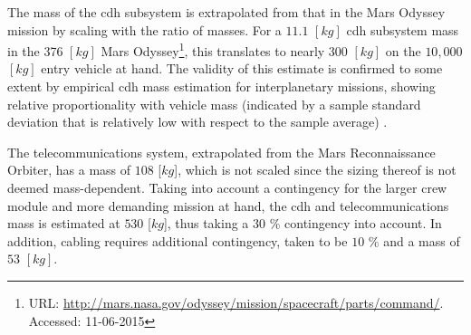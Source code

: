 The mass of the \gls{cdh} subsystem is extrapolated from that in the Mars Odyssey mission by scaling with the ratio of masses. For a $11.1$ $[kg]$ \gls{cdh} subsystem mass in the 376 $[kg]$ Mars Odyssey\footnote{URL: \url{http://mars.nasa.gov/odyssey/mission/spacecraft/parts/command/}. Accessed: 11-06-2015}, this translates to nearly $300$ $[kg]$ on the $10,000$ $[kg]$ entry vehicle at hand. The validity of this estimate is confirmed to some extent by empirical \gls{cdh} mass estimation for interplanetary missions, showing relative proportionality with vehicle mass (indicated by a sample standard deviation that is relatively low with respect to the sample average) \cite[p.953]{Wertz2011}.

The telecommunications system, extrapolated from the Mars Reconnaissance Orbiter, has a mass of $108$ [$kg$], which is not scaled since the sizing thereof is not deemed mass-dependent. Taking into account a contingency for the larger crew module and more demanding mission at hand, the \gls{cdh} and telecommunications mass is estimated at $530$ [$kg$], thus taking a $30$ $\%$ contingency into account. In addition, cabling requires additional contingency, taken to be $10$ $\%$ and a mass of $53$ $[kg]$.

